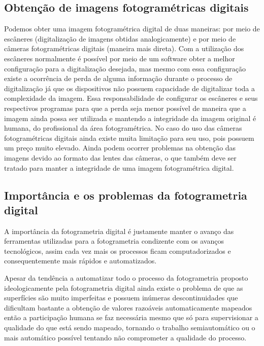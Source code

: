 \subsection{Obtenção de imagens fotogramétricas digitais}
Podemos obter uma imagem fotogramétrica digital de duas maneiras: por meio de escâneres (digitalização de imagens obtidas analogicamente) e por meio de câmeras fotogramétricas digitais (maneira mais direta). Com a utilização dos escâneres normalmente é possível por meio de um software obter a melhor configuração para a digitalização desejada, mas mesmo com essa configuração existe a ocorrência de perda de alguma informação durante o processo de digitalização já que os dispositivos não possuem capacidade de digitalizar toda a complexidade da imagem. Essa responsabilidade de configurar os escâneres e seus respectivos programas para que a perda seja menor possível de maneira que a imagem ainda possa ser utilizada e mantendo a integridade da imagem original é humana, do profissional da área fotogramétrica. No caso do uso das câmeras fotogramétricas digitais ainda existe muita limitação para seu uso, pois possuem um preço muito elevado. Ainda podem ocorrer problemas na obtenção das imagens devido ao formato das lentes das câmeras, o que também deve ser tratado para manter a integridade de uma imagem fotogramétrica digital.

\subsection{Importância e os problemas da fotogrametria digital}
A importância da fotogrametria digital é justamente manter o avanço das ferramentas utilizadas para a fotogrametria condizente com os avanços tecnológicos, assim cada vez mais os processos ficam computadorizados e consequentemente mais rápidos e automatizados.

Apesar da tendência a automatizar todo o processo da fotogrametria proposto ideologicamente pela fotogrametria digital ainda existe o problema de que as superfícies são muito imperfeitas e possuem inúmeras descontinuidades que dificultam bastante a obtenção de valores razoáveis automaticamente mapeados então a participação humana se faz necessária mesmo que só para supervisionar a qualidade do que está sendo mapeado, tornando o trabalho semiautomático ou o mais automático possível tentando não comprometer a qualidade do processo.

